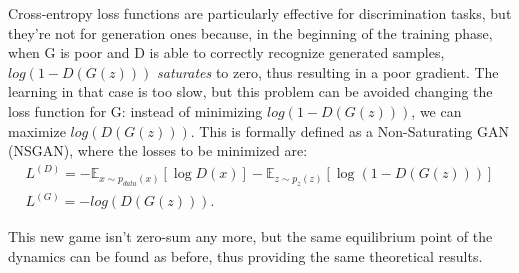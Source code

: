 Cross-entropy loss functions are particularly effective for discrimination tasks, but they're not for generation ones because, in the beginning of the training phase, when G is poor and D is able to correctly recognize generated samples, $log(1-D(G(z)))$ \textit{saturates} to zero, thus resulting in a poor gradient. The learning in that case is too slow, but this problem can be avoided changing the loss function for G: instead of minimizing $log(1-D(G(z)))$, we can maximize $log(D(G(z)))$. This is formally defined as a Non-Saturating GAN (NSGAN), where the losses to be minimized are:
\begin{align*}
L^{(D)} = -\mathbb{E}_{x \sim p_{data}(x)}[\log D(x)] - \mathbb{E}_{z \sim p_{z}(z)}[\log (1-D(G(z)))]\\
L^{(G)} = - log(D(G(z))).
\end{align*}

This new game isn't zero-sum any more, but the same equilibrium point of the dynamics can be found as before, thus providing the same theoretical results.

